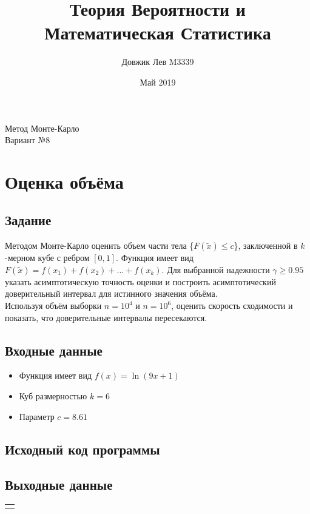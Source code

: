 \documentclass{article}
\title{Теория Вероятности и Математическая Статистика}
\author{Довжик Лев M3339}
\date{Май 2019}
\begin{document}
\maketitle
\begin{center}
    Метод Монте-Карло \\
    Вариант №8
\end{center}

\section{Оценка объёма}
    \subsection{Задание}
        Методом Монте-Карло оценить объем части тела \{$F(\tilde x) \leq c$\}, заключенной в $k$-мерном кубе с ребром $[0, 1]$. 
        Функция имеет вид $F(\tilde x) = f(x_1) + f(x_2) + ... + f(x_k)$.
        Для выбранной надежности $\gamma \geq 0.95$ указать асимптотическую точность оценки и построить асимптотический доверительный интервал для истинного значения объёма. \\
        Используя объём выборки $n = 10^4$ и $n = 10^6$, оценить скорость сходимости и показать, что доверительные интервалы пересекаются.
    \subsection{Входные данные}
        \begin{itemize}
            \item Функция имеет вид $f(x) = \ln(9x + 1)$
            \item Куб размерностью $k = 6$
            \item Параметр $c = 8.61$ 
        \end{itemize}
    \subsection{Исходный код программы}
        \begin{minipage}{\linewidth}
            
        \end{minipage}
    \subsection{Выходные данные}
    \begin{center}
\begin{tabular}{c}
        \begin{minipage}{\linewidth}
            
        \end{minipage}
        \end{tabular}
        \end{center}
\end{document}
